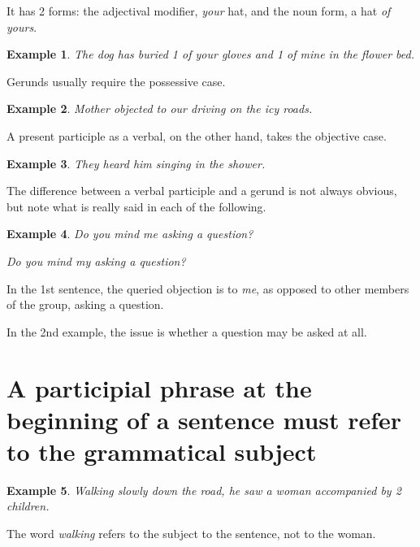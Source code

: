 \documentclass{book}
\numberwithin{equation}{section}
\newtheorem{example}{Example}[chapter]
\begin{document}
It has 2 forms: the adjectival modifier, \textit{your} hat, and the noun form, a hat \textit{of yours}.
\begin{example}
    The dog has buried 1 of your gloves and 1 of mine in the flower bed.
\end{example}
Gerunds usually require the possessive case.
\begin{example}
    Mother objected to our driving on the icy roads.
\end{example}
A present participle as a verbal, on the other hand, takes the objective case.
\begin{example}
    They heard him singing in the shower.
\end{example}
The difference between a verbal participle and a gerund is not always obvious, but note what is really said in each of the following.
\begin{example}
    Do you mind me asking a question?
    
    Do you mind my asking a question?
\end{example}
In the 1st sentence, the queried objection is to \textit{me}, as opposed to other members of the group, asking a question.

In the 2nd example, the issue is whether a question may be asked at all.

\section{A participial phrase at the beginning of a sentence must refer to the grammatical subject}
\begin{example}
    Walking slowly down the road, he saw a woman accompanied by 2 children.
\end{example}
The word \textit{walking} refers to the subject to the sentence, not to the woman.
\end{document}
